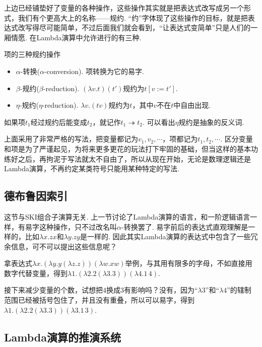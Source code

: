上边已经铺垫好了变量的各种操作，这些操作其实就是把表达式改写成另一个形式，我们有个更高大上的名称——规约. “约”字体现了这些操作的目标，就是把表达式改写得尽可能简单，不过后面我们就会看到，“让表达式变简单”只是人们的一厢情愿. 在Lambda演算中允许进行的有三种.
\begin{definition}{项的三种规约操作}
    \begin{itemize}
        \item \(\alpha\)-转换(\(\alpha\)-conversion). 项转换为它的易字.
        \item \(\beta\)-规约(\(\beta\)-reduction). \((\lambda v.t)(t')\)规约为\(t[v:=t']\).
        \item \(\eta\)-规约(\(\eta\)-reduction). \(\lambda v.(t v)\)规约为\(t\)，其中\(v\)不在\(t\)中自由出现.
    \end{itemize}
\end{definition}

如果项\(t_1\)经过规约后能变成\(t_2\)，就记作\(t_1 \twoheadrightarrow t_2\). 可以看出\(\eta\)规约是抽象的反义词. 

上面采用了非常严格的写法，把变量都记为\(v_1,v_2,\cdots\)，项都记为\(t_1,t_2,\cdots\). 区分变量和项是为了严谨起见，为将来更多更花的玩法打下牢固的基础，但当这样的基本功练好之后，再拘泥于写法就太不自由了，所以从现在开始，无论是数理逻辑还是Lambda演算，不再约定某类符号只能用某种特定的写法.

\subsection{德布鲁因索引}

这节与SKI组合子演算无关. 上一节讨论了Lambda演算的语言，和一阶逻辑语言一样，有易字这种操作，只不过改名叫\(\alpha\)-转换罢了. 易字前后的表达式直观理解是一样的，比如\(\lambda x. zx\)和\(\lambda y. zy\)是一样的. 因此其实Lambda演算的表达式中包含了一些冗余信息，可不可以提出这些信息呢？

拿表达式\(\lambda x.(\lambda y.y(\lambda z.z))(\lambda w. xw)\)举例，与其用有限多的字母，不如直接用数字代替变量，得到\(\lambda 1.(\lambda 2.2(\lambda 3.3))(\lambda 4. 1\,4)\). 

接下来减少变量的个数，试想把\(4\)换成\(3\)有影响吗？没有，因为“\(\lambda 3\)”和“\(\lambda 4\)”的辖制范围已经被括号包住了，并且没有重叠，所以可以易字，得到\(\lambda 1.(\lambda 2.2(\lambda 3.3))(\lambda 3. 1\,3)\).

\subsection{Lambda演算的推演系统}

